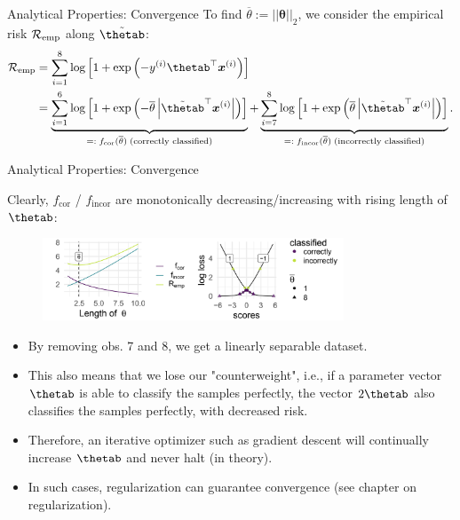 \begin{vbframe}{Analytical Properties: Convergence}
To find $\overline{\theta} := ||\bm{\theta}||_2$, we consider the empirical risk $\mathcal{R}_{\text{emp}}$ along $\tilde\thetab$:
\begin{align*}
\riske &= \sum^8_{i=1} \log \left[1 + \exp \left(-y^{(i)}\thetab^\top \xv^{(i)}\right)\right] \\
&= \underbrace{\sum^6_{i=1} \log \left[1 + \exp \left(- \overline{\theta} \left|\tilde{\thetab}^\top \xv^{(i)}\right|\right)\right]}_{=: \; f_{\text{cor}}(\overline{\theta}) \;\text{(correctly classified)}} +
\underbrace{\sum^8_{i=7}\log \left[1 + \exp \left( \overline{\theta} \left| \tilde{\thetab}^\top \xv^{(i)}\right|\right)\right]}_{=:\; f_{\text{incor}}(\overline{\theta}) \;\text{(incorrectly classified)}}.
\end{align*}

\end{vbframe}


\begin{vbframe}{Analytical Properties: Convergence}



Clearly, $f_{\text{cor}}$ / $f_{\text{incor}}$ are monotonically decreasing/increasing with rising length of $\thetab$:

\begin{figure}
\includegraphics[width=0.8\textwidth]{figure_man/undet-problem02.png}\\
\end{figure}

\begin{itemize}
\item By removing obs. 7 and 8, we get a linearly separable dataset. \\
\item This also means that we lose our "counterweight", i.e., if a parameter vector $\thetab$ is able to classify the samples perfectly, the vector $2\thetab$ also classifies the samples perfectly, with decreased risk.
\item Therefore, an iterative optimizer such as gradient descent will continually increase $\thetab$ and never halt (in theory).
\item In such cases, regularization can guarantee convergence (see chapter on regularization). 
\end{itemize}

\end{vbframe}





